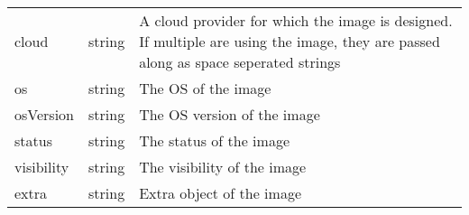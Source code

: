 \documentclass[9pt,]{article}
\begin{document}
\begin{longtable}[]{@{}lll@{}}
\begin{minipage}[t]{0.17\columnwidth}\raggedright
cloud\strut
\end{minipage} & \begin{minipage}[t]{0.14\columnwidth}\raggedright
string\strut
\end{minipage} & \begin{minipage}[t]{0.58\columnwidth}\raggedright
A cloud provider for which the image is designed. If multiple are using
the image, they are passed along as space seperated strings\strut
\end{minipage}\tabularnewline
\begin{minipage}[t]{0.17\columnwidth}\raggedright
os\strut
\end{minipage} & \begin{minipage}[t]{0.14\columnwidth}\raggedright
string\strut
\end{minipage} & \begin{minipage}[t]{0.58\columnwidth}\raggedright
The OS of the image\strut
\end{minipage}\tabularnewline
\begin{minipage}[t]{0.17\columnwidth}\raggedright
osVersion\strut
\end{minipage} & \begin{minipage}[t]{0.14\columnwidth}\raggedright
string\strut
\end{minipage} & \begin{minipage}[t]{0.58\columnwidth}\raggedright
The OS version of the image\strut
\end{minipage}\tabularnewline
\begin{minipage}[t]{0.17\columnwidth}\raggedright
status\strut
\end{minipage} & \begin{minipage}[t]{0.14\columnwidth}\raggedright
string\strut
\end{minipage} & \begin{minipage}[t]{0.58\columnwidth}\raggedright
The status of the image\strut
\end{minipage}\tabularnewline
\begin{minipage}[t]{0.17\columnwidth}\raggedright
visibility\strut
\end{minipage} & \begin{minipage}[t]{0.14\columnwidth}\raggedright
string\strut
\end{minipage} & \begin{minipage}[t]{0.58\columnwidth}\raggedright
The visibility of the image\strut
\end{minipage}\tabularnewline
\begin{minipage}[t]{0.17\columnwidth}\raggedright
extra\strut
\end{minipage} & \begin{minipage}[t]{0.14\columnwidth}\raggedright
string\strut
\end{minipage} & \begin{minipage}[t]{0.58\columnwidth}\raggedright
Extra object of the image\strut
\end{minipage}\tabularnewline
\bottomrule
\end{longtable}
\end{document}
